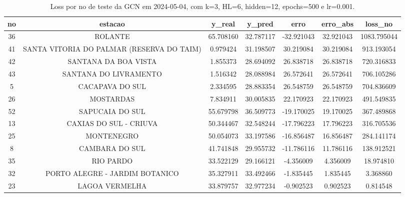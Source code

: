 \begin{table}[h]
\centering
\caption{Loss por no de teste da GCN em 2024-05-04, com k=3, HL=6, hidden=12, epochs=500 e lr=0.001.}
\label{tab:gcn_loss_k3_hl6_h12_e500_d20240504}
\begin{tabular}{ccccccc}
\toprule
no & estacao & y\_real & y\_pred & erro & erro\_abs & loss\_no \\
\midrule
36 & ROLANTE & 65.708160 & 32.787117 & -32.921043 & 32.921043 & 1083.795044 \\
41 & SANTA VITORIA DO PALMAR (RESERVA DO TAIM) & 0.979424 & 31.198507 & 30.219084 & 30.219084 & 913.193054 \\
42 & SANTANA DA BOA VISTA & 1.855373 & 28.694092 & 26.838718 & 26.838718 & 720.316833 \\
43 & SANTANA DO LIVRAMENTO & 1.516342 & 28.088984 & 26.572641 & 26.572641 & 706.105286 \\
5 & CACAPAVA DO SUL & 2.334595 & 28.883354 & 26.548759 & 26.548759 & 704.836609 \\
26 & MOSTARDAS & 7.834911 & 30.005835 & 22.170923 & 22.170923 & 491.549835 \\
52 & SAPUCAIA DO SUL & 55.679798 & 36.509773 & -19.170025 & 19.170025 & 367.489868 \\
13 & CAXIAS DO SUL - CRIUVA & 50.344467 & 32.548244 & -17.796223 & 17.796223 & 316.705536 \\
25 & MONTENEGRO & 50.054073 & 33.197586 & -16.856487 & 16.856487 & 284.141174 \\
8 & CAMBARA DO SUL & 41.741848 & 29.955732 & -11.786116 & 11.786116 & 138.912521 \\
35 & RIO PARDO & 33.522129 & 29.166121 & -4.356009 & 4.356009 & 18.974810 \\
32 & PORTO ALEGRE - JARDIM BOTANICO & 35.327911 & 33.492466 & -1.835445 & 1.835445 & 3.368860 \\
23 & LAGOA VERMELHA & 33.879757 & 32.977234 & -0.902523 & 0.902523 & 0.814548 \\
\bottomrule
\end{tabular}
\end{table}
